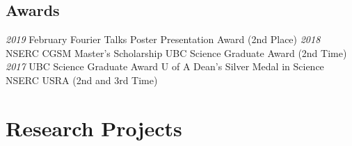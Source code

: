 \documentclass[a4paper]{cv-friggeri}
\begin{document}
\begin{aside}
\section{Awards}
\emph{2019}
February Fourier Talks Poster Presentation Award (2nd Place)
\emph{2018}
NSERC CGSM Master's Scholarship
UBC Science Graduate Award (2nd Time)
\emph{2017}
UBC Science Graduate Award
U of A Dean's Silver Medal in Science
NSERC USRA
(2nd and 3rd Time)
\end{aside}


\section{Research Projects}
\end{document}
